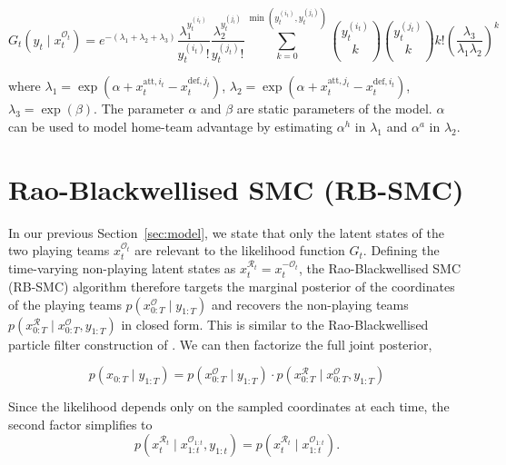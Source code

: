 \begin{equation}
\label{eq:likelihood}
    G_t(y_t \mid x_t^{\mathcal{O}_t}) = e^{-(\lambda_1 + \lambda_2 + \lambda_3)} \frac{\lambda_1^{y_t^{(i_t)}}}{y_t^{(i_t)}!} \frac{\lambda_2^{y_t^{(j_t)}}}{y_t^{(j_t)}!} \sum_{k=0}^{\min(y_t^{(i_t)}, y_t^{(j_t)})} \binom{y_t^{(i_t)}}{k} \binom{y_t^{(j_t)}}{k} k! \left( \frac{\lambda_{3}}{\lambda_1 \lambda_2} \right)^k
\end{equation}

where $\lambda_1 = \exp(\alpha + x_t^{\text{att}, i_t} - x_t^{\text{def}, j_t})$, $\lambda_2 = \exp(\alpha + x_t^{\text{att}, j_t} - x_t^{\text{def}, i_t})$, $\lambda_3 = \exp(\beta)$. The parameter $\alpha$ and $\beta$ are static parameters of the model. $\alpha$ can be used to model home-team advantage by estimating $\alpha^h$ in $\lambda_1$ and $\alpha^a$ in $\lambda_2$.


\section{Rao-Blackwellised SMC (RB-SMC)}
\label{sec:rb-smc}
In our previous Section~\ref{sec:model}, we state that only the latent states of the two playing teams $x_t^{\mathcal{O}_t}$ are relevant to the likelihood function $G_t$. Defining the time-varying non-playing latent states as $x_t^{\mathcal{R}_t} = x_t^{-\mathcal{O}_t}$, the Rao-Blackwellised SMC (RB-SMC) algorithm therefore targets the marginal posterior of the coordinates of the playing teams $p(x_{0:T}^{\mathcal{O}} \mid y_{1:T})$ and recovers the non-playing teams $p(x_{0:T}^{\mathcal{R}} \mid x_{0:T}^{\mathcal{O}}, y_{1:T})$ in closed form. This is similar to the Rao-Blackwellised particle filter construction of \citet{doucetdefreitasmurphyrussell2000rbpf}. We can then factorize the full joint posterior,

\begin{equation}
    p(x_{0:T} \mid y_{1:T}) = p(x_{0:T}^{\mathcal{O}} \mid y_{1:T}) \cdot p(x_{0:T}^{\mathcal{R}} \mid x_{0:T}^{\mathcal{O}}, y_{1:T})
\end{equation}

Since the likelihood depends only on the sampled coordinates at each time, the second factor simplifies to
\begin{equation*}
    p(x_t^{\mathcal{R}_t} \mid x_{1:t}^{\mathcal{O}_{1:t}}, y_{1:t}) = p(x_t^{\mathcal{R}_t} \mid x_{1:t}^{\mathcal{O}_{1:t}}).
\end{equation*}

